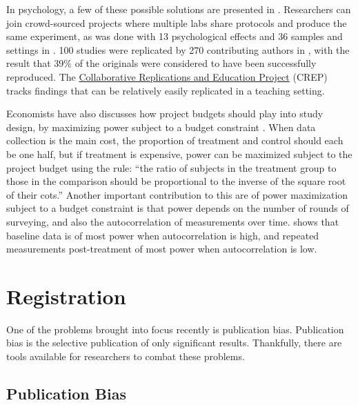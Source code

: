 \documentclass[12pt] {article}
\begin{document}
In psychology, a few of these possible solutions are presented in \cite{openmaximizing}. Researchers can join crowd-sourced projects where multiple labs share protocols and produce the same experiment, as was done with 13 psychological effects and 36 samples and settings in \cite{many_labs}. 100 studies were replicated by 270 contributing authors in \cite{RPP}, with the result that 39\% of the originals were considered to have been successfully reproduced. The \href{https://osf.io/wfc6u/}{Collaborative Replications and Education Project} (CREP) tracks findings that can be relatively easily replicated in a teaching setting. 

Economists have also discusses how project budgets should play into study design, by maximizing power subject to a budget constraint \cite{randomizationtoolkit}. When data collection is the main cost, the proportion of treatment and control should each be one half, but if treatment is expensive, power can be maximized subject to the project budget using the rule: ``the ratio of subjects in the treatment group to those in the comparison should be proportional to the inverse of the square root of their cots.''  Another important contribution to this are of power maximization subject to a budget constraint is that power depends on the number of rounds of surveying, and also the autocorrelation of measurements over time. \cite{mckenzie2012caseformoreT} shows that baseline data is of most power when autocorrelation is high, and repeated measurements post-treatment of most power when autocorrelation is low.





\section{Registration}\label{registration}

One of the problems brought into focus recently is publication bias.
Publication bias is the selective publication of only significant
results. Thankfully, there are tools available for researchers to combat
these problems.

\subsection{Publication Bias}\label{publication-bias}
\end{document}
